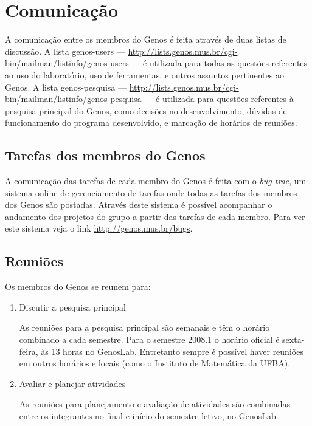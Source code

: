 \documentclass[12pt,brazil]{book}
\begin{document}
\section{Comunicação}
\label{sec:comunicacao}

A comunicação entre os membros do Genos é feita através de duas listas
de discussão. A lista genos-users ---
\url{http://lists.genos.mus.br/cgi-bin/mailman/listinfo/genos-users}
--- é utilizada para todas as questões referentes ao uso do
laboratório, uso de ferramentas, e outros assuntos pertinentes ao
Genos. A lista genos-pesquisa ---
\url{http://lists.genos.mus.br/cgi-bin/mailman/listinfo/genos-pesquisa}
--- é utilizada para questões referentes à pesquisa principal do
Genos, como decisões no desenvolvimento, dúvidas de funcionamento do
programa desenvolvido, e marcação de horários de reuniões.

\subsection{Tarefas dos membros do Genos}
\label{sec:tarefas-dos-membros}

A comunicação das tarefas de cada membro do Genos é feita com o
\textit{bug trac}, um sistema online de gerenciamento de tarefas onde
todas as tarefas dos membros dos Genos são postadas. Através deste
sistema é possível acompanhar o andamento dos projetos do grupo a
partir das tarefas de cada membro. Para ver este sistema veja o link
\url{http://genos.mus.br/bugs}.

\subsection{Reuniões}
\label{sec:reunioes}

Os membros do Genos se reunem para:

\begin{enumerate}
\item Discutir a pesquisa principal

  As reuniões para a pesquisa principal são semanais e têm o horário
  combinado a cada semestre. Para o semestre 2008.1 o horário oficial
  é sexta-feira, às 13 horas no GenosLab. Entretanto sempre é possível
  haver reuniões em outros horários e locais (como o Instituto de
  Matemática da UFBA).

\item Avaliar e planejar atividades

  As reuniões para planejamento e avaliação de atividades são
  combinadas entre os integrantes no final e início do semestre
  letivo, no GenosLab.

\end{enumerate}
\end{document}
